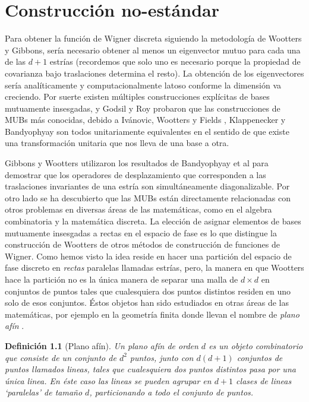 \documentclass[a4paper]{report}
\newtheorem{definition}{Definición}
\begin{document}
  \chapter{Construcción no-estándar}

  Para obtener la función de Wigner discreta siguiendo la
  metodología de Wootters y Gibbons, sería necesario obtener
  al menos un eigenvector mutuo para cada una de las $d+1$
  estrías (recordemos que solo uno es necesario porque la
  propiedad de covarianza bajo traslaciones determina el
  resto). La obtención de los eigenvectores sería
  analíticamente y computacionalmente latoso conforme la
  dimensión va creciendo. Por suerte existen múltiples
  construcciones explícitas de bases mutuamente insesgadas,
  y Godsil y Roy \cite{godsil2009} probaron que las
  construcciones de MUBs más conocidas, debido a Ivánovic,
  Wootters y Fields \cite{wootters1989}, Klappenecker
  \cite{klappenecker2005a} y Bandyophyay
  \cite{bandyopadhyay2001} son todos unitariamente
  equivalentes en el sentido de que existe una
  transformación unitaria que nos lleva de una base a otra.

  Gibbons y Wootters utilizaron los resultados de
  Bandyophyay et al para demostrar que los operadores de
  desplazamiento que corresponden a las traslaciones
  invariantes de una estría son simultáneamente
  diagonalizable. Por otro lado se ha descubierto que las
  MUBs están directamente relacionadas con otros problemas
  en diversas áreas de las matemáticas, como en el algebra
  combinatoria y la matemática discreta. La elección de
  asignar elementos de bases mutuamente insesgadas a rectas
  en el espacio de fase es lo que distingue la construcción
  de Wootters de otros métodos de construcción de funciones
  de Wigner. Como hemos visto la idea reside en hacer una
  partición del espacio de fase discreto en \textit{rectas}
  paralelas llamadas estrías, pero, la manera en que
  Wootters hace la partición no es la única manera de
  separar una malla de $d \times d$ en conjuntos de puntos
  tales que cualesquiera dos puntos distintos residen en uno
  solo de esos conjuntos. Éstos objetos han sido estudiados
  en otras áreas de las matemáticas, por ejemplo en la
  geometría finita donde llevan el nombre de \textit{plano
  afín} \cite{kantor2012}. 

  \begin{definition}[Plano afín]
    Un plano afín de orden $d$ es un objeto combinatorio que
    consiste de un conjunto de $d^2$ puntos, junto con
    $d(d+1)$ conjuntos de puntos llamados \textit{lineas},
    tales que cualesquiera dos puntos distintos pasa por una
    única linea. En éste caso las lineas se pueden agrupar
    en $d+1$ clases de lineas `paralelas' de tamaño $d$,
    particionando a todo el conjunto de puntos. 
  \end{definition}
\end{document}
